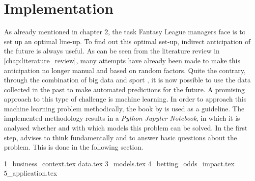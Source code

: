 \chapter{Implementation}

As already mentioned in chapter 2, the task Fantasy League managers face is to set up an optimal line-up. To find out this optimal set-up, indirect anticipation of the future is always useful. As can be seen from the literature review in \autoref{chap:literature_review}, many attempts have already been made to make this anticipation no longer manual and based on random factors. Quite the contrary, through the combination of big data and sport \parencite[][cf.]{rein_big_2016}, it is now possible to use the data collected in the past to make automated predictions for the future. A promising approach to this type of challenge is machine learning. In order to approach this machine learning problem methodically, the book  by \citeauthor{geron_hands-machine_2019} is used as a guideline. The implemented methodology results in a \emph{Python Jupyter Notebook}, in which it is analysed whether and with which models this problem can be solved. In the first step, \citeauthor{geron_hands-machine_2019} advises to think fundamentally and to answer basic questions about the problem. This is done in the following section.

{1_business_context.tex}
{data.tex}
{3_models.tex}
{4_betting_odds_impact.tex}
{5_application.tex}




